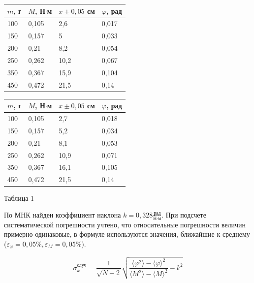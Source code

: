 \documentclass[a4paper, 12pt]{article}
\begin{document}
  \begin{table}[h!]
 \centering
    \parbox{.4 \textwidth}{
        \centering
        \begin{tabular}{|l|l|l|l|}
        \hline
            $m$, г & $M$, Н$\cdot$м & $x \pm 0,05$ см & $\varphi$, рад \\ \hline
            100 & 0,105 & 2,6 & 0,017 \\ \hline
            150 & 0,157 & 5 & 0,033 \\ \hline
            200 & 0,21 & 8,2 & 0,054 \\ \hline
            250 & 0,262 & 10,2 & 0,067 \\ \hline
            350 & 0,367 & 15,9 & 0,104 \\ \hline
            450 & 0,472 & 21,5 & 0,14 \\ \hline
        \end{tabular}
        \label{tab:1}
    }
    \hfill
    \parbox{.5 \textwidth}{
        \centering
        \begin{tabular}{|l|l|l|l|}
        \hline
            $m$, г & $M$, Н$\cdot$м & $x \pm 0,05$ см & $\varphi$, рад \\ \hline
            100 & 0,105 & 2,7 & 0,018 \\ \hline
            150 & 0,157 & 5,2 & 0,034 \\ \hline
            200 & 0,21 & 8,1 & 0,053 \\ \hline
            250 & 0,262 & 10,9 & 0,071 \\ \hline
            350 & 0,367 & 16,1 & 0,105 \\ \hline
            450 & 0,472 & 21,5 & 0,14 \\ \hline
        \end{tabular}
        \label{tab:2}
    }
 \end{table}
 
 \begin{center}
     Таблица 1
 \end{center}

По МНК найден коэффициент наклона $k = 0,328 \frac{\text{рад}}{\text{Н$\cdot$м}}$. При подсчете систематической погрешности учтено, что относительные погрешности величин примерно одинаковые, в формуле используются значения, ближайшие к среднему ($\varepsilon_{\varphi} = 0,05 \%, \varepsilon_M = 0,05 \%$).

\[ \sigma_k^{\text{случ}} = \frac{1}{\sqrt{N - 2}}\sqrt{\frac{\langle \varphi^2 \rangle -\langle \varphi \rangle^2}{
    \langle M^2 \rangle - \langle M \rangle^2} - k^2}\]
\end{document}
